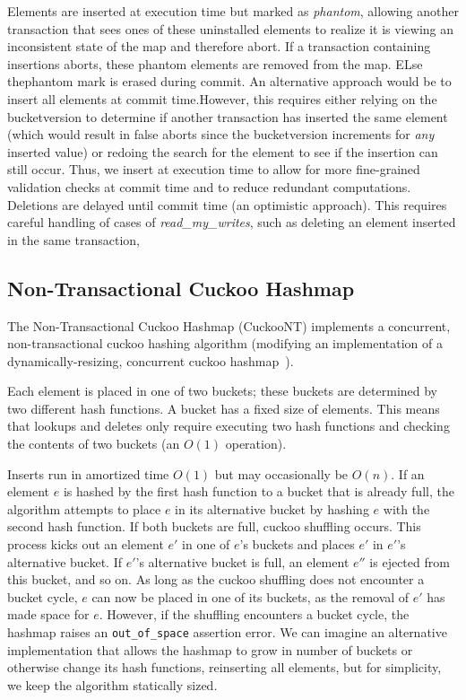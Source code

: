 Elements are inserted at execution time but marked as \emph{phantom}, allowing another transaction that sees ones of these uninstalled elements to realize it is viewing an inconsistent state of the map and therefore abort. If a transaction containing insertions aborts, these phantom elements are removed from the map. ELse thephantom mark is erased during commit. An alternative approach would be to insert all elements at commit time.However, this requires either relying on the bucketversion to determine if another transaction has inserted the same element (which would result in false aborts since the bucketversion increments for \emph{any} inserted value) or redoing the search for the element to see if the insertion can still occur. Thus, we insert at execution time to allow for more fine-grained validation checks at commit time and to reduce redundant computations. Deletions are delayed until commit time (an optimistic approach). This requires careful handling of cases of \emph{read\_my\_writes}, such as deleting an element inserted in the same transaction, 

\subsection{Non-Transactional Cuckoo Hashmap}
The Non-Transactional Cuckoo Hashmap (CuckooNT) implements a concurrent, non-transactional cuckoo hashing algorithm (modifying an implementation of a dynamically-resizing, concurrent cuckoo hashmap~\cite{cuckoocode}).

Each element is placed in one of two buckets; these buckets are determined by two different hash functions. A bucket has a fixed size of elements. This means that lookups and deletes only require executing two hash functions and checking the contents of two buckets (an $O(1)$ operation).

Inserts run in amortized time $O(1)$ but may occasionally be $O(n)$.
If an element $e$ is hashed by the first hash function to a bucket that is already full, the algorithm attempts to place $e$ in its alternative bucket by hashing $e$ with the second hash function. If both buckets are full, cuckoo shuffling occurs. This process kicks out an element $e'$ in one of $e$'s buckets and places $e'$ in $e'$'s alternative bucket. If $e'$'s alternative bucket is full, an element $e''$ is ejected from this bucket, and so on. As long as the cuckoo shuffling does not encounter a bucket cycle, $e$ can now be placed in one of its buckets, as the removal of $e'$ has made space for $e$.
However, if the shuffling encounters a bucket cycle, the hashmap raises an \texttt{{out\_of\_space}} assertion error. We can imagine an alternative implementation that allows the hashmap to grow in number of buckets or otherwise change its hash functions, reinserting all elements, but for simplicity, we keep the algorithm statically sized.

